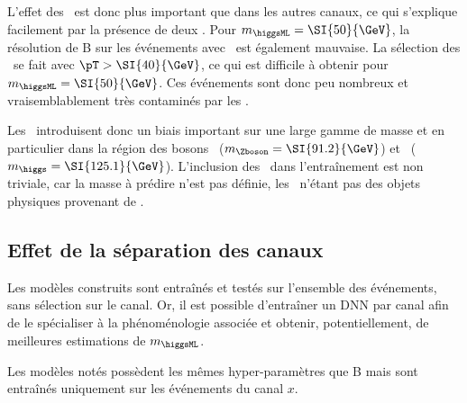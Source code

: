 L'effet des \ftauhs\ est donc plus important que dans les autres canaux,
ce qui s'explique facilement par la présence de deux \tauh.
Pour $m_{\higgsML}=\SI{50}{\GeV}$, la résolution de B sur les événements avec \DEEPTAU\ est également mauvaise.
La sélection des \tauh\ se fait avec $\pT>\SI{40}{\GeV}$, ce qui est difficile à obtenir pour $m_{\higgsML}=\SI{50}{\GeV}$.
Ces événements sont donc peu nombreux et vraisemblablement très contaminés par les \ftauhs.
\par
Les \ftauhs\ introduisent donc un biais important sur une large gamme de masse
et en particulier dans la région des bosons
\Zboson\ ($m_{\Zboson}=\SI{91.2}{\GeV}$)
et
\higgs\ ($m_{\higgs}=\SI{125.1}{\GeV}$).
L'inclusion des \ftauhs\ dans l'entraînement est non triviale, car la masse à prédire n'est pas définie,
les \ftauhs\ n'étant pas des objets physiques provenant de \higgsML.
\subsection{Effet de la séparation des canaux}
\def\Bchsplit#1{\ifthenelse{\equal{#1}{x}}{$\text{B}^{#1}$}{$\text{B}^\text{\GetChannelStr{#1}}$}}
Les modèles construits sont entraînés et testés sur l'ensemble des événements, sans sélection sur le canal.
Or,
il est possible d'entraîner un DNN par canal afin de le spécialiser à la phénoménologie associée
et obtenir, potentiellement, de meilleures estimations de $m_{\higgsML}$.
\par
Les modèles notés \Bchsplit{x} possèdent les mêmes hyper-paramètres que B mais sont entraînés uniquement sur les événements du canal $x$.
